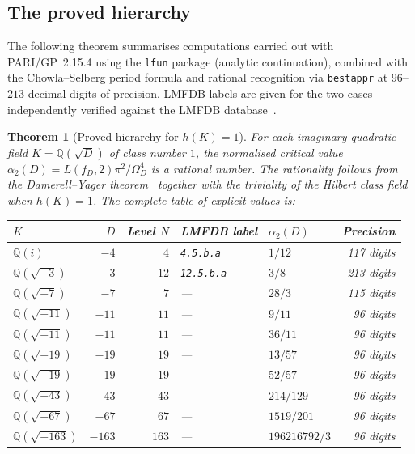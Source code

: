 \documentclass[12pt]{amsart}
\newtheorem{theorem}{Theorem}[section]
\theoremstyle{definition}
\newcommand{\Q}{\mathbb{Q}}
\newcommand{\Omega}{\varOmega}
\begin{document}
\subsection{The proved hierarchy}

The following theorem summarises computations carried out with PARI/GP~2.15.4
using the \texttt{lfun} package (analytic continuation), combined with the
Chowla--Selberg period formula and rational recognition via \texttt{bestappr}
at $96$--$213$ decimal digits of precision.
LMFDB labels are given for the two cases independently verified against the
LMFDB database~\cite{LMFDB2026}.

\begin{theorem}[Proved hierarchy for $h(K)=1$]
  \label{thm:hierarchy}
  For each imaginary quadratic field $K = \Q(\sqrt{D})$ of class number $1$,
  the normalised critical value $\alpha_2(D) = L(f_D,2)\pi^2/\Omega_D^4$
  is a rational number. The rationality follows from the Damerell--Yager
  theorem~\cite{Damerell1971,Yager1982} together with the triviality of
  the Hilbert class field when $h(K)=1$. The complete table of explicit
  values is:

  \begin{center}
  \renewcommand{\arraystretch}{1.35}
  \begin{tabular}{lrrllr}
    \toprule
    $K$ & $D$ & Level $N$ & LMFDB label & $\alpha_2(D)$ & Precision \\
    \midrule
    $\Q(i)$         & $-4$   & $4$   & \texttt{4.5.b.a}  & $1/12$          & 117 digits \\
    $\Q(\sqrt{-3})$ & $-3$   & $12$  & \texttt{12.5.b.a} & $3/8$           & 213 digits \\
    $\Q(\sqrt{-7})$ & $-7$   & $7$   & ---               & $28/3$          & 115 digits \\
    $\Q(\sqrt{-11})$& $-11$  & $11$  & ---               & $9/11$          &  96 digits \\
    $\Q(\sqrt{-11})$& $-11$  & $11$  & ---               & $36/11$         &  96 digits \\
    $\Q(\sqrt{-19})$& $-19$  & $19$  & ---               & $13/57$         &  96 digits \\
    $\Q(\sqrt{-19})$& $-19$  & $19$  & ---               & $52/57$         &  96 digits \\
    $\Q(\sqrt{-43})$& $-43$  & $43$  & ---               & $214/129$       &  96 digits \\
    $\Q(\sqrt{-67})$& $-67$  & $67$  & ---               & $1519/201$      &  96 digits \\
    $\Q(\sqrt{-163})$& $-163$ & $163$ & ---              & $196216792/3$   &  96 digits \\
    \bottomrule
  \end{tabular}
  \end{center}


\end{theorem}
\end{document}
